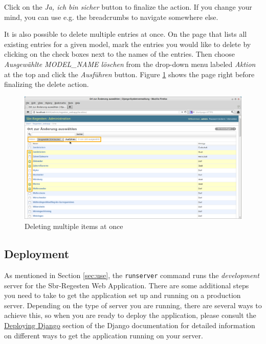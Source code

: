 Click on the \emph{Ja, ich bin sicher} button to finalize the action.
If you change your mind, you can use e.g. the breadcrumbs to navigate
somewhere else.

It is also possible to delete multiple entries at once. On the page
that lists all existing entries for a given model, mark the entries
you would like to delete by clicking on the check boxes next to the
names of the entries. Then choose \emph{Ausgewählte MODEL\_NAME
  löschen} from the drop-down menu labeled \emph{Aktion} at the top
and click the \emph{Ausführen} button. Figure
\ref{fig:delete-multiple} shows the page right before finalizing the
delete action.

\begin{figure}[h]
  \centering
  \includegraphics[scale=0.3]{img/delete-multiple}
  \caption{Deleting multiple items at once}
  \label{fig:delete-multiple}
\end{figure}

\subsection{Deployment}
\label{sec:deploy}

As mentioned in Section \ref{sec:use}, the \texttt{runserver} command
runs the \emph{development} server for the Sbr-Regesten Web
Application. There are some additional steps you need to take to get
the application set up and running on a production server. Depending
on the type of server you are running, there are several ways to
achieve this, so when you are ready to deploy the application, please
consult the
\href{https://docs.djangoproject.com/en/1.4/howto/deployment/}{Deploying
  Django} section of the Django documentation for detailed information
on different ways to get the application running on your server.

